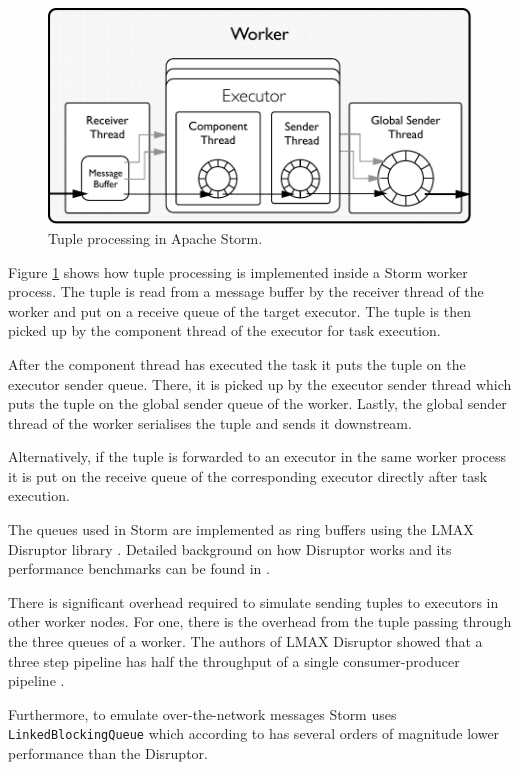 \documentclass[bsc,logo,frontabs,twoside,singlespacing,normalheadings,parskip]{infthesis}\usepackage[]{graphicx}\usepackage[]{color}
\begin{document}
\begin{figure}[!htb]
	\centering
	\includegraphics[scale=0.7]{pdf/worker_inside.pdf}
	\caption{Tuple processing in Apache Storm.}
	\label{fig:worker_inside}
\end{figure}

Figure \ref{fig:worker_inside} shows how tuple processing is implemented inside a Storm worker process. The tuple is read from a message buffer by the receiver thread of the worker and put on a receive queue of the target executor. The tuple is then picked up by the component thread of the executor for task execution.

After the component thread has executed the task it puts the tuple on the executor sender queue. There, it is picked up by the executor sender thread which puts the tuple on the global sender queue of the worker. Lastly, the global sender thread of the worker serialises the tuple and sends it downstream.

Alternatively, if the tuple is forwarded to an executor in the same worker process it is put on the receive queue of the corresponding executor directly after task execution.

The queues used in Storm are implemented as ring buffers using the LMAX Disruptor library \citep{LMAXDisruptor}. Detailed background on how Disruptor works and its performance benchmarks can be found in \cite{Thompson_Farley_Barker_Gee_Stewart_2011}.

There is significant overhead required to simulate sending tuples to executors in other worker nodes. For one, there is the overhead from the tuple passing through the three queues of a worker. The authors of LMAX Disruptor showed that a three step pipeline has half the throughput of a single consumer-producer pipeline \cite{DisruptorWiki}.

Furthermore, to emulate over-the-network messages Storm uses \texttt{LinkedBlockingQueue} which according to \cite{Thompson_Farley_Barker_Gee_Stewart_2011} has several orders of magnitude lower performance than the Disruptor.
\end{document}
